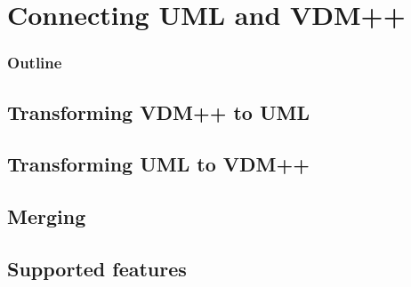 %
%
\section{Connecting UML and VDM++}
%
%
\begin{frame}
  \frametitle{Outline}
  \tableofcontents[current]
\end{frame}





\subsection{Transforming VDM++ to UML}




\subsection{Transforming UML to VDM++}




\subsection{Merging}




\subsection{Supported features}
